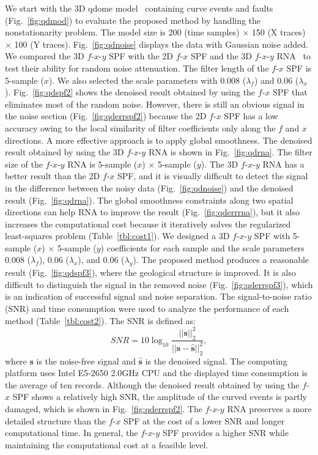 We start with the 3D qdome model~\cite{Claerbout08} containing curve
events and faults (Fig.~\ref{fig:qdmod}) to evaluate the proposed
method by handling the nonstationarity problem. The model size is 200
(time samples) $\times$ 150 (X traces) $\times$ 100 (Y traces).
Fig.~\ref{fig:qdnoise} displays the data with Gaussian noise added.
We compared the 3D $f$-$x$-$y$ SPF with the 2D $f$-$x$ SPF and the 3D
$f$-$x$-$y$ RNA~\cite{Liug13} to test their ability for random noise
attenuation. The filter length of the $f$-$x$ SPF is 5-sample
($x$). We also selected the scale parameters with 0.008
($\lambda_{f}$) and 0.06 ($\lambda_{x}$). Fig.~\ref{fig:qdspf2} shows
the denoised result obtained by using the $f$-$x$ SPF that eliminates
most of the random noise. However, there is still an obvious signal in
the noise section (Fig.~\ref{fig:qderrspf2}) because the 2D $f$-$x$
SPF has a low accuracy owing to the local similarity of filter
coefficients only along the $f$ and $x$ directions. A more effective
approach is to apply global smoothness. The denoised result obtained
by using the 3D $f$-$x$-$y$ RNA is shown in Fig.~\ref{fig:qdrna}.  The
filter size of the $f$-$x$-$y$ RNA is 5-sample ($x$) $\times$ 5-sample
($y$). The 3D $f$-$x$-$y$ RNA has a better result than the 2D $f$-$x$
SPF, and it is visually difficult to detect the signal in the
difference between the noisy data (Fig.~\ref{fig:qdnoise}) and the
denoised result (Fig.~\ref{fig:qdrna}).  The global smoothness
constraints along two spatial directions can help RNA to improve the
result (Fig.~\ref{fig:qderrrna}), but it also increases the
computational cost because it iteratively solves the regularized
least-squares problem (Table~\ref{tbl:cost1}).  We designed a 3D
$f$-$x$-$y$ SPF with 5-sample ($x$) $\times$ 5-sample ($y$)
coefficients for each sample and the scale parameters 0.008
($\lambda_{f}$), 0.06 ($\lambda_{x}$), and 0.06 ($\lambda_{y}$). The
proposed method produces a reasonable result (Fig.~\ref{fig:qdspf3}),
where the geological structure is improved. It is also difficult to
distinguish the signal in the removed noise
(Fig.~\ref{fig:qderrspf3}), which is an indication of successful
signal and noise separation. The signal-to-noise ratio (SNR) and time
consumption were used to analyze the performance of each method
(Table~\ref{tbl:cost2}). The SNR is defined as:
\begin{equation}
    \label{eq:snr}
    SNR=10\log_{10}\frac{||\mathbf{s}||_2^2}
    {||\mathbf{s}-\hat{\mathbf{s}}||_2^2},
\end{equation}
where $\mathbf{s}$ is the noise-free signal and $\hat{\mathbf{s}}$ is
the denoised signal. The computing platform uses Intel E5-2650 2.0GHz
CPU and the displayed time consumption is the average of ten
records. Although the denoised result obtained by using the $f$-$x$
SPF shows a relatively high SNR, the amplitude of the curved events is
partly damaged, which is shown in Fig.~\ref{fig:qderrspf2}.  The
$f$-$x$-$y$ RNA preserves a more detailed structure than the $f$-$x$
SPF at the cost of a lower SNR and longer computational time. In
general, the $f$-$x$-$y$ SPF provides a higher SNR while maintaining
the computational cost at a feasible level.

